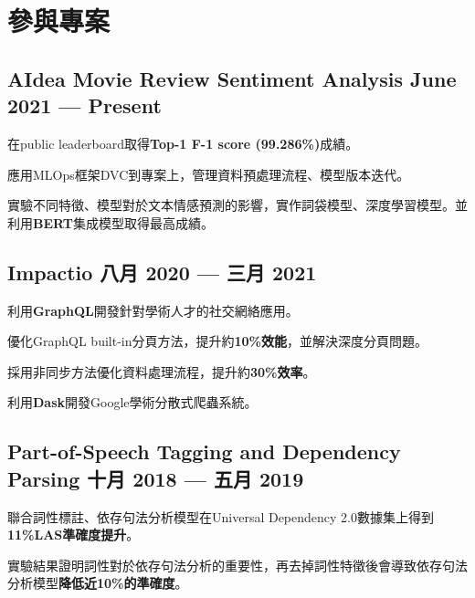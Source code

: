 \section{參與專案}

        

\subsection*{AIdea Movie Review Sentiment Analysis \hfill June 2021 --- Present} 
\begin{zitemize}
    \item 在public leaderboard取得\textbf{Top-1 F-1 score (99.286\%)}成績。
    \item 應用MLOps框架DVC到專案上，管理資料預處理流程、模型版本迭代。
    \item 實驗不同特徵、模型對於文本情感預測的影響，實作詞袋模型、深度學習模型。並利用\textbf{BERT}集成模型取得最高成績。
\end{zitemize}


\subsection*{Impactio \hfill 八月 2020 --- 三月 2021} 
    \begin{zitemize}
        \item 利用\textbf{GraphQL}開發針對學術人才的社交網絡應用。
        \item 優化GraphQL built-in分頁方法，提升約\textbf{10\%效能}，並解決深度分頁問題。
        \item 採用非同步方法優化資料處理流程，提升約\textbf{30\%效率}。
        \item 利用\textbf{Dask}開發Google學術分散式爬蟲系統。
    \end{zitemize}


\subsection*{Part-of-Speech Tagging and Dependency Parsing \hfill 十月 2018 --- 五月 2019} 
    \begin{zitemize}
        \item 聯合詞性標註、依存句法分析模型在Universal Dependency 2.0數據集上得到\textbf{11\%LAS準確度提升}。
        \item 實驗結果證明詞性對於依存句法分析的重要性，再去掉詞性特徵後會導致依存句法分析模型\textbf{降低近10\%的準確度}。
    \end{zitemize}


